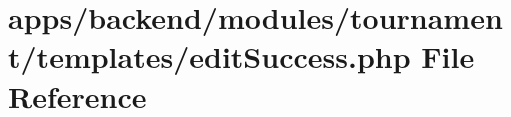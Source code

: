\hypertarget{backend_2modules_2tournament_2templates_2edit_success_8php}{\section{apps/backend/modules/tournament/templates/edit\-Success.php File Reference}
\label{backend_2modules_2tournament_2templates_2edit_success_8php}
}
